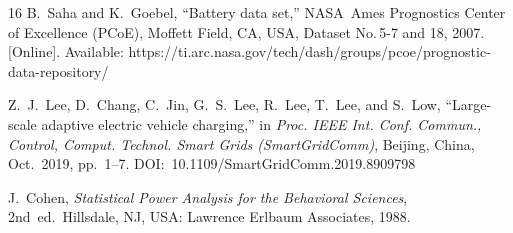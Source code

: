 \documentclass[journal,10pt,twocolumn]{IEEEtran}
\begin{document}
\begin{thebibliography}{16}
B.~Saha and K.~Goebel,
``Battery data set,''
NASA~Ames Prognostics Center of Excellence (PCoE), Moffett Field,
CA, USA, Dataset No.\,5-7 and 18, 2007.
[Online]. Available: https://ti.arc.nasa.gov/tech/dash/groups/pcoe/prognostic-data-repository/


Z.~J.~Lee, D.~Chang, C.~Jin, G.~S.~Lee, R.~Lee, T.~Lee, and S.~Low,
``Large-scale adaptive electric vehicle charging,''
in \textit{Proc. IEEE Int. Conf. Commun., Control, Comput. Technol.
Smart Grids (SmartGridComm)}, Beijing, China, Oct.~2019, pp.~1--7.
DOI:~10.1109/SmartGridComm.2019.8909798


J.~Cohen,
\textit{Statistical Power Analysis for the Behavioral Sciences},
2nd~ed.\ Hillsdale, NJ, USA: Lawrence Erlbaum Associates, 1988.

\end{thebibliography}
\end{document}
